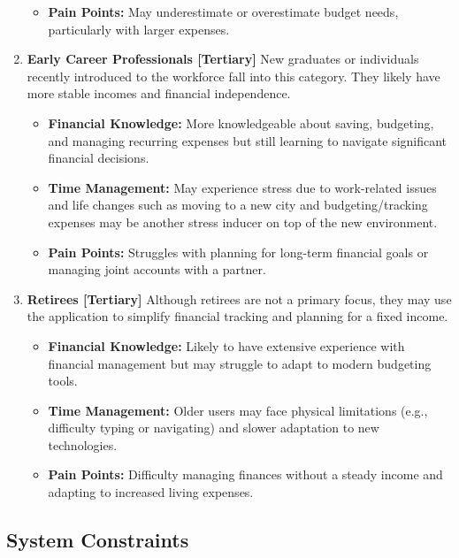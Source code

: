 \documentclass[12pt]{article}
\begin{document}
\begin{enumerate}
\begin{itemize}
			\item \textbf{Pain Points:}  May underestimate or overestimate budget needs, particularly with larger expenses.
		\end{itemize}
	\item \textbf{Early Career Professionals [Tertiary]}
		New graduates or individuals recently introduced to the workforce fall into this category. They likely have more stable incomes and financial independence.
		\begin{itemize}
			\item \textbf{Financial Knowledge:} More knowledgeable about saving, budgeting, and managing recurring expenses but still learning to navigate significant financial decisions.
			\item \textbf{Time Management:} May experience stress due to work-related issues and life changes such as moving to a new city and budgeting/tracking expenses may be another stress inducer on top of the new environment.
			\item \textbf{Pain Points:} Struggles with planning for long-term financial goals or managing joint accounts with a partner.
		\end{itemize}
	\item \textbf{Retirees [Tertiary]}
		Although retirees are not a primary focus, they may use the application to simplify financial tracking and planning for a fixed income.
		\begin{itemize}
			\item \textbf{Financial Knowledge:} Likely to have extensive experience with financial management but may struggle to adapt to modern budgeting tools.
			\item \textbf{Time Management:} Older users may face physical limitations (e.g., difficulty typing or navigating) and slower adaptation to new technologies.
			\item \textbf{Pain Points:} Difficulty managing finances without a steady income and adapting to increased living expenses.
		\end{itemize}
\end{enumerate}

\newpage

\subsection{System Constraints}
\end{document}
